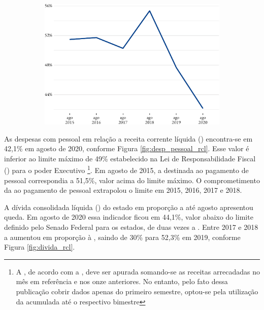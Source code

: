 \begin{figure}[!h]
\begin{subfigure}{\linewidth}
		\includegraphics{fig/desp_pessoal_rcl-1.pdf}
	\end{subfigure}
\end{figure}

As despesas com pessoal em relação a receita corrente líquida () encontra-se em 42,1\% em agosto
de 2020, conforme Figura \ref{fig:desp_pessoal_rcl}. Esse valor é inferior ao limite máximo de 49\% estabelecido na Lei de
Responsabilidade Fiscal () para o poder Executivo
\footnote{A , de acordo com a , deve ser apurada somando-se as receitas arrecadadas no mês em referência e nos onze anteriores. No entanto, pelo fato  dessa publicação cobrir dados apenas do primeiro semestre, optou-se pela utilização da  acumulada até o respectivo bimestre}.
Em agosto de 2015, a  destinada ao pagamento de pessoal
correspondia a 51,5\%, valor acima do limite máximo. O comprometimento
da  ao pagamento de pessoal extrapolou o limite em 2015, 2016,
2017 e 2018.

A dívida consolidada líquida () do estado em proporção a
 até agosto apresentou queda. Em agosto de 2020 essa indicador
ficou em 44,1\%, valor abaixo do limite definido pelo Senado Federal
para os estados, de duas vezes a . Entre 2017 e 2018 a
 aumentou em proporção à , saindo de 30\% para
52,3\% em 2019, conforme Figura \ref{fig:divida_rcl}.


